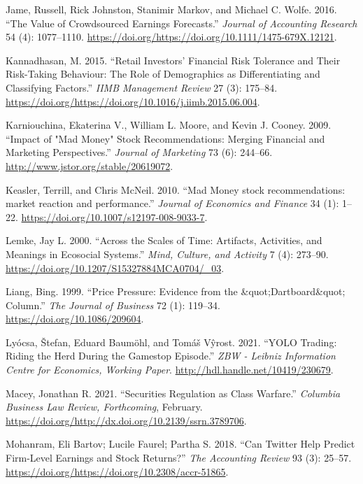 \documentclass[12pt,]{article}
\begin{document}
\leavevmode\hypertarget{ref-jame2016}{}%
Jame, Russell, Rick Johnston, Stanimir Markov, and Michael C. Wolfe.
2016. ``The Value of Crowdsourced Earnings Forecasts.'' \emph{Journal of
Accounting Research} 54 (4): 1077--1110.
\url{https://doi.org/https://doi.org/10.1111/1475-679X.12121}.

\leavevmode\hypertarget{ref-kannadhasan2015}{}%
Kannadhasan, M. 2015. ``Retail Investors' Financial Risk Tolerance and
Their Risk-Taking Behaviour: The Role of Demographics as Differentiating
and Classifying Factors.'' \emph{IIMB Management Review} 27 (3):
175--84.
\url{https://doi.org/https://doi.org/10.1016/j.iimb.2015.06.004}.

\leavevmode\hypertarget{ref-karniouchina2009}{}%
Karniouchina, Ekaterina V., William L. Moore, and Kevin J. Cooney. 2009.
``Impact of "Mad Money" Stock Recommendations: Merging Financial and
Marketing Perspectives.'' \emph{Journal of Marketing} 73 (6): 244--66.
\url{http://www.jstor.org/stable/20619072}.

\leavevmode\hypertarget{ref-keasler2010}{}%
Keasler, Terrill, and Chris McNeil. 2010. ``Mad Money stock
recommendations: market reaction and performance.'' \emph{Journal of
Economics and Finance} 34 (1): 1--22.
\url{https://doi.org/10.1007/s12197-008-9033-7}.

\leavevmode\hypertarget{ref-lemke}{}%
Lemke, Jay L. 2000. ``Across the Scales of Time: Artifacts, Activities,
and Meanings in Ecosocial Systems.'' \emph{Mind, Culture, and Activity}
7 (4): 273--90. \url{https://doi.org/10.1207/S15327884MCA0704/_03}.

\leavevmode\hypertarget{ref-liang1999}{}%
Liang, Bing. 1999. ``Price Pressure: Evidence from the
\&quot;Dartboard\&quot; Column.'' \emph{The Journal of Business} 72 (1):
119--34. \url{https://doi.org/10.1086/209604}.

\leavevmode\hypertarget{ref-lyocsa2021}{}%
Lyócsa, Štefan, Eduard Baumöhl, and Tomáš Vŷrost. 2021. ``YOLO Trading:
Riding the Herd During the Gamestop Episode.'' \emph{ZBW - Leibniz
Information Centre for Economics, Working Paper}.
\url{http://hdl.handle.net/10419/230679}.

\leavevmode\hypertarget{ref-macey2021}{}%
Macey, Jonathan R. 2021. ``Securities Regulation as Class Warfare.''
\emph{Columbia Business Law Review, Forthcoming}, February.
\url{https://doi.org/http://dx.doi.org/10.2139/ssrn.3789706}.

\leavevmode\hypertarget{ref-bartov2018}{}%
Mohanram, Eli Bartov; Lucile Faurel; Partha S. 2018. ``Can Twitter Help
Predict Firm-Level Earnings and Stock Returns?'' \emph{The Accounting
Review} 93 (3): 25--57.
\url{https://doi.org/https://doi.org/10.2308/accr-51865}.
\end{document}

